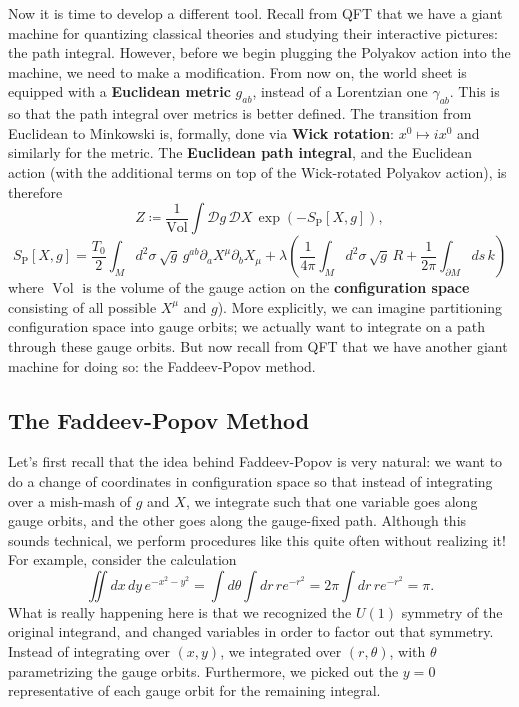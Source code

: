 \documentclass{report}
\theoremstyle{plain}
\theoremstyle{definition}
\theoremstyle{remark}
\newcommand{\di}{\partial}
\newcommand{\cD}{\mathcal{D}}
\DeclareMathOperator{\Vol}{Vol}
\begin{document}
Now it is time to develop a different tool. Recall from QFT that we
have a giant machine for quantizing classical theories and studying
their interactive pictures: the path integral. However, before we
begin plugging the Polyakov action into the machine, we need to make a
modification. From now on, the world sheet is equipped with a {\bf
  Euclidean metric} $g_{ab}$, instead of a Lorentzian one
$\gamma_{ab}$. This is so that the path integral over metrics is
better defined. The transition from Euclidean to Minkowski is,
formally, done via {\bf Wick rotation}: $x^0 \mapsto ix^0$ and
similarly for the metric. The {\bf Euclidean path integral}, and the
Euclidean action (with the additional terms on top of the Wick-rotated
Polyakov action), is therefore
\[ Z \coloneqq \frac{1}{\Vol} \int \cD g \, \cD X \, \exp(-S_{\text{P}}[X, g]), \]
\[ S_{\text{P}}[X, g] = \frac{T_0}{2} \int_M d^2\sigma \, \sqrt{g} \, g^{ab} \di_a X^\mu \di_b X_\mu + \lambda\left(\frac{1}{4\pi} \int_M d^2\sigma \, \sqrt{g} \, R + \frac{1}{2\pi}\int_{\di M} ds \, k\right) \]
where $\Vol$ is the volume of the gauge action on the {\bf
  configuration space} consisting of all possible $X^\mu$ and
$g$). More explicitly, we can imagine partitioning configuration
space into gauge orbits; we actually want to integrate on a path
through these gauge orbits. But now recall from QFT that we have
another giant machine for doing so: the Faddeev-Popov method.

\subsection{The Faddeev-Popov Method}

Let's first recall that the idea behind Faddeev-Popov is very natural:
we want to do a change of coordinates in configuration space so that
instead of integrating over a mish-mash of $g$ and $X$, we integrate
such that one variable goes along gauge orbits, and the other goes
along the gauge-fixed path. Although this sounds technical, we perform
procedures like this quite often without realizing it! For example,
consider the calculation
\[ \iint dx \, dy \, e^{-x^2 - y^2} = \int d\theta \int dr \, r e^{-r^2} = 2\pi \int dr \, r e^{-r^2} = \pi. \]
What is really happening here is that we recognized the $U(1)$
symmetry of the original integrand, and changed variables in order to
factor out that symmetry. Instead of integrating over $(x, y)$, we
integrated over $(r, \theta)$, with $\theta$ parametrizing the gauge
orbits. Furthermore, we picked out the $y = 0$ representative of
each gauge orbit for the remaining integral.
\end{document}
